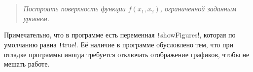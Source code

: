 \section*{  }
\begin{quote}
    \textit{Построить поверхность функции $f(x_1,x_2)$, ограниченной заданным уровнем. }
\end{quote}


Примечательно, что в программе есть переменная \texttt!showFigures!, которая по умолчанию равна \texttt!true!.
Её наличие в программе обусловлено тем, что при отладке программы иногда требуется отключать отображение графиков, чтобы не мешать работе.


